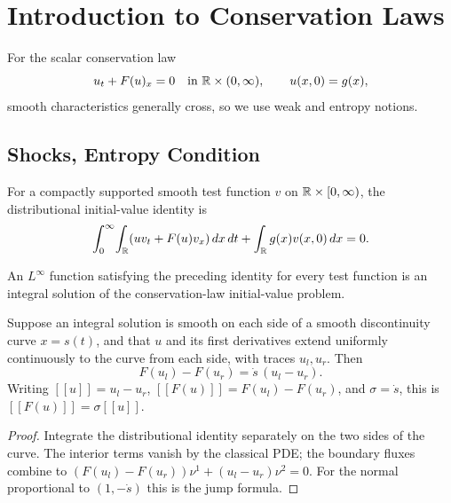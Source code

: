 \section{Introduction to Conservation Laws}
\label{sec:conservation-laws-intro}

For the scalar conservation law
\[
u_t+F(u)_x=0\quad\text{in }\mathbb{R}\times(0,\infty),\qquad u(x,0)=g(x),
\]
smooth characteristics generally cross, so we use weak and entropy notions.

\subsection{Shocks, Entropy Condition}
\label{sec:shocks-entropy-condition}

For a compactly supported smooth test function $v$ on
$\mathbb{R}\times[0,\infty)$, the distributional initial-value identity is
\[
\int_0^\infty\!\int_{\mathbb{R}}(uv_t+F(u)v_x)\,dx\,dt+
\int_{\mathbb{R}} g(x)v(x,0)\,dx=0.
\]

\begin{definition}
\label{def:integral-solution-conservation-law}
An $L^\infty$ function satisfying the preceding identity for every test
function is an integral solution of the conservation-law initial-value
problem.
\end{definition}

\begin{proposition}
\label{prop:rankine-hugoniot-condition}

Suppose an integral solution is smooth on each side of a smooth discontinuity
curve $x=s(t)$, and that $u$ and its first derivatives extend uniformly
continuously to the curve from each side, with traces $u_l,u_r$. Then
\[
F(u_l)-F(u_r)=\dot s\,(u_l-u_r).
\]
Writing $[[u]]=u_l-u_r$, $[[F(u)]]=F(u_l)-F(u_r)$, and $\sigma=\dot s$,
this is $[[F(u)]]=\sigma[[u]]$.
\end{proposition}

\begin{proof}
\sketch Integrate the distributional identity separately on the two sides
of the curve. The interior terms vanish by the classical PDE; the boundary
fluxes combine to
$(F(u_l)-F(u_r))\nu^1+(u_l-u_r)\nu^2=0$. For the normal proportional to
$(1,-\dot s)$ this is the jump formula.
\end{proof}

